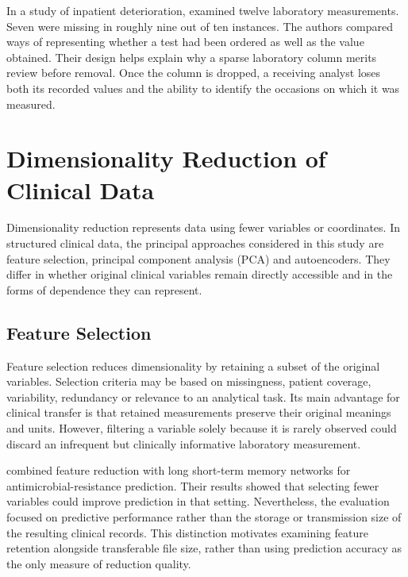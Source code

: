 \noindent In a study of inpatient deterioration, \citet{Sun2024} examined twelve laboratory measurements. Seven were missing in roughly nine out of ten instances. The authors compared ways of representing whether a test had been ordered as well as the value obtained. Their design helps explain why a sparse laboratory column merits review before removal. Once the column is dropped, a receiving analyst loses both its recorded values and the ability to identify the occasions on which it was measured.

\section{Dimensionality Reduction of Clinical Data}\label{dimensionality-reduction-of-clinical-data}

Dimensionality reduction represents data using fewer variables or
coordinates. In structured clinical data, the principal approaches
considered in this study are feature selection, principal component
analysis (PCA) and autoencoders. They differ in whether original
clinical variables remain directly accessible and in the forms of
dependence they can represent.

\subsection{Feature Selection}\label{feature-selection}

Feature selection reduces dimensionality by retaining a subset of the
original variables. Selection criteria may be based on missingness,
patient coverage, variability, redundancy or relevance to an analytical
task. Its main advantage for clinical transfer is that retained
measurements preserve their original meanings and units. However,
filtering a variable solely because it is rarely observed could discard
an infrequent but clinically informative laboratory measurement.

\noindent \citet{Hernandez2023} combined feature reduction with long short-term
memory networks for antimicrobial-resistance prediction. Their results
showed that selecting fewer variables could improve prediction in that
setting. Nevertheless, the evaluation focused on predictive performance
rather than the storage or transmission size of the resulting clinical
records. This distinction motivates examining feature retention
alongside transferable file size, rather than using prediction accuracy
as the only measure of reduction quality.

